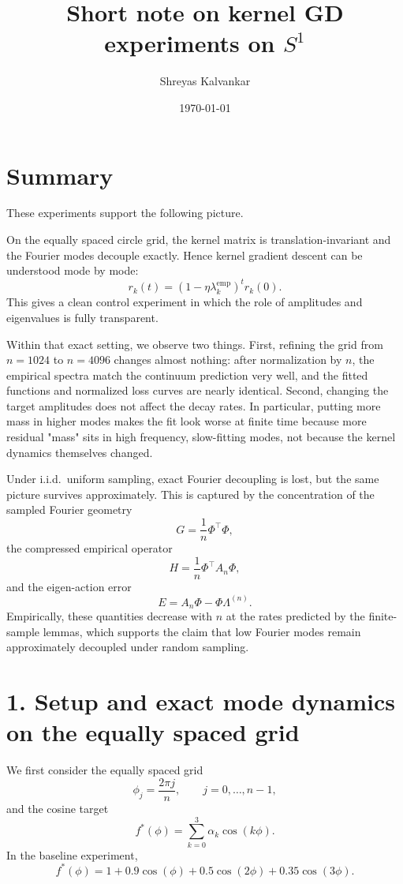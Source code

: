 \documentclass[11pt]{article}
\title{Short note on kernel GD experiments on $S^1$}
\author{Shreyas Kalvankar}
\date{\today}
\begin{document}
\maketitle

\section*{Summary}

These experiments support the following picture.

On the equally spaced circle grid, the kernel matrix is translation-invariant
and the Fourier modes decouple exactly. Hence kernel gradient descent can be
understood mode by mode:
\[
	r_k(t)=(1-\eta \lambda_k^{\mathrm{emp}})^t r_k(0).
\]
This gives a clean control experiment in which the role of amplitudes and
eigenvalues is fully transparent.

Within that exact setting, we observe two things. First, refining the grid from
$n=1024$ to $n=4096$ changes almost nothing: after normalization by $n$, the
empirical spectra match the continuum prediction very well, and the fitted
functions and normalized loss curves are nearly identical. Second, changing the
target amplitudes does not affect the decay rates. In particular, putting more mass in higher
modes makes the fit look worse at finite time because more residual "mass" sits
in high frequency, slow-fitting modes, not because the kernel dynamics themselves
changed.

Under i.i.d.\ uniform sampling, exact Fourier decoupling is lost, but the same
picture survives approximately. This is captured by the concentration of the
sampled Fourier geometry
\[
	G=\frac1n\Phi^\top\Phi,
\]
the compressed empirical operator
\[
	H=\frac1n\Phi^\top A_n\Phi,
\]
and the eigen-action error
\[
	E=A_n\Phi-\Phi\Lambda^{(n)}.
\]
Empirically, these quantities decrease with $n$ at the rates predicted by the finite-sample lemmas, which supports the claim that low Fourier modes remain approximately decoupled under random sampling.

\section*{1. Setup and exact mode dynamics on the equally spaced grid}

We first consider the equally spaced grid
\[
	\phi_j=\frac{2\pi j}{n}, \qquad j=0,\dots,n-1,
\]
and the cosine target
\[
	f^*(\phi)=\sum_{k=0}^3 \alpha_k \cos(k\phi).
\]
In the baseline experiment,
\[
	f^*(\phi)=1+0.9\cos(\phi)+0.5\cos(2\phi)+0.35\cos(3\phi).
\]
\end{document}
